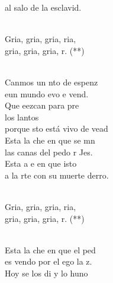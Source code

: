 \begin{cancion}
	al salo de la esclavid. \\\jump\\
	\begin{chorus}%
	Gria, gria, gria, ria,\\
	gria, gria, gria, r. (**)\\
	\end{chorus}%
	\jump\\
	Canmos un nto de espenz\\
	eun mundo evo e vend.  \\
	Que eezcan para pre \\
	los lantos\\
	porque sto está vivo de vead\\
	Esta  la che en que se mn\\
	las canas del pedo r Jes.\\
	Esta a e en que isto\\
	a la rte con su muerte derro. \\\jump\\
	\begin{chorus}%
	Gria, gria, gria, ria,\\
	gria, gria, gria, r. (**)\\
	\end{chorus}%
	\jump\\
	Esta  la che en que el ped\\
	es vendo por el ego  la z.\\
	Hoy se  los di y lo huno\\

\end{cancion}
